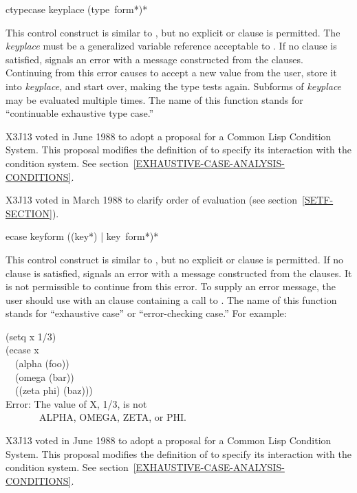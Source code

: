 \begin{defmac}
ctypecase keyplace {(type {\,form}*)}*

\begin{obsolete}\noindent
This control construct is similar to ,
but no explicit  or  clause is permitted.
The {\it keyplace} must be a generalized variable reference
acceptable to .  If no clause is satisfied,  signals an
error with a message constructed from the clauses.  Continuing from this
error causes  to accept a new value from the user, store
it into {\it keyplace}, and start over, making the type tests again.
Subforms of {\it keyplace} may be evaluated multiple times.  The name
of this function stands for ``continuable exhaustive type case.''
\end{obsolete}

\begin{new}
X3J13 voted in June 1988
to adopt a proposal for a Common Lisp Condition System. 
This proposal modifies the definition of  to specify its
interaction with the condition system.
See section~\ref{EXHAUSTIVE-CASE-ANALYSIS-CONDITIONS}.
\end{new}

\begin{newer}
X3J13 voted in March 1988 
to clarify order of evaluation (see section~\ref{SETF-SECTION}).
\end{newer}
\end{defmac}

\begin{defmac}
ecase keyform {({({key}*) | key} {\,form}*)}*

\begin{obsolete}\noindent
This control construct is similar to ,
but no explicit  or  clause is permitted.
If no clause is satisfied,  signals an error with a
message constructed from the clauses.  It is not permissible to continue
from this error.  To supply an error message, the user should use
 with an  clause containing a call to .
The name of this function stands for ``exhaustive case'' or
``error-checking case.'' 
For example:
\begin{lisp}
(setq x 1/3)	 \\
(ecase x \\
~~(alpha (foo)) \\
~~(omega (bar)) \\
~~((zeta phi) (baz))) \\
Error: The value of X, 1/3, is not \\
~~~~~~~ALPHA, OMEGA, ZETA, or PHI.
\end{lisp}
\end{obsolete}

\begin{new}
X3J13 voted in June 1988
to adopt a proposal for a Common Lisp Condition System. 
This proposal modifies the definition of  to specify its
interaction with the condition system.
See section~\ref{EXHAUSTIVE-CASE-ANALYSIS-CONDITIONS}.
\end{new}
\end{defmac}

